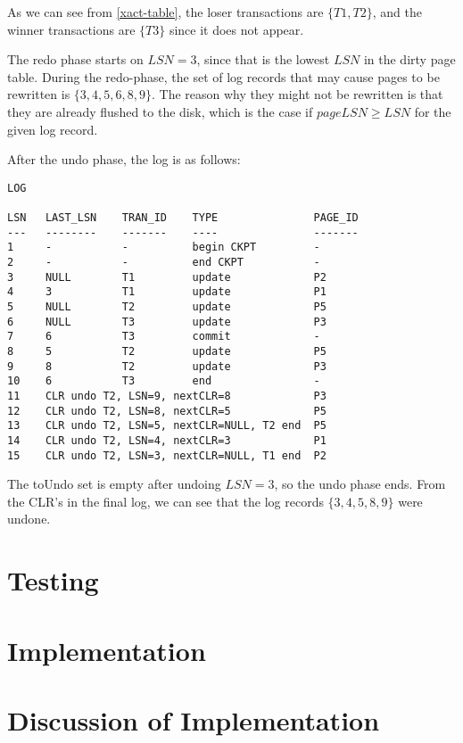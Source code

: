 \documentclass[11pt,a4paper]{article}
\begin{document}
As we can see from \autoref{xact-table}, the loser transactions are
$\{T1,T2\}$, and the winner transactions are $\{T3\}$ since it does not appear.

The redo phase starts on $LSN = 3$, since that is the lowest $LSN$ in the dirty
page table. During the redo-phase, the set of log records that may cause pages
to be rewritten is $\{3,4,5,6,8,9\}$. The reason why they might not be
rewritten is that they are already flushed to the disk, which is the case if
$pageLSN \geq LSN$ for the given log record.

After the undo phase, the log is as follows:

\begin{verbatim}
LOG

LSN   LAST_LSN    TRAN_ID    TYPE               PAGE_ID
---   --------    -------    ----               -------
1     -           -          begin CKPT         -
2     -           -          end CKPT           -
3     NULL        T1         update             P2
4     3           T1         update             P1
5     NULL        T2         update             P5
6     NULL        T3         update             P3
7     6           T3         commit             -
8     5           T2         update             P5
9     8           T2         update             P3
10    6           T3         end                -
11    CLR undo T2, LSN=9, nextCLR=8             P3
12    CLR undo T2, LSN=8, nextCLR=5             P5
13    CLR undo T2, LSN=5, nextCLR=NULL, T2 end  P5
14    CLR undo T2, LSN=4, nextCLR=3             P1
15    CLR undo T2, LSN=3, nextCLR=NULL, T1 end  P2
\end{verbatim}

The toUndo set is empty after undoing $LSN = 3$, so the undo phase ends. From
the CLR's in the final log, we can see that the log records $\{3,4,5,8,9\}$
were undone.

\section{Testing}

\section{Implementation}

\section{Discussion of Implementation}
\end{document}
